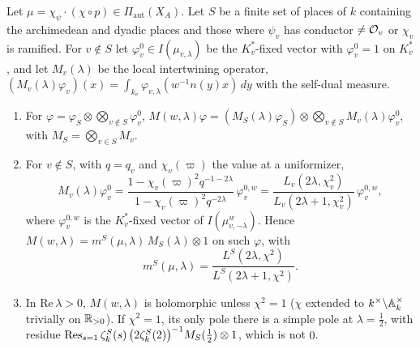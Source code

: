 \begin{lemma}\label{lem:intertwining}
Let $\mu=\chi_\psi\cdot(\chi\circ p)\in\Pi_{\mathrm{aut}}(X_A)$. Let $S$
be a finite set of places of $k$ containing the archimedean and dyadic
places and those where $\psi_v$ has conductor $\ne\mathcal{O}_v$ or $\chi_v$ is
ramified. For $v\notin S$ let $\varphi_v^0\in I(\mu_{v,\lambda})$ be the
$K_v^*$-fixed vector with $\varphi_v^0=1$ on $K_v^*$, and let $M_v(\lambda)$
be the local intertwining operator, $(M_v(\lambda)\varphi_v)(x)=
\int_{k_v}\varphi_{v,\lambda}(w^{-1}n(y)x)\,dy$ with the self-dual
measure.
\begin{enumerate}[label=(\alph*)]
\item For $\varphi=\varphi_S\otimes\bigotimes_{v\notin S}\varphi_v^0$,
  $M(w,\lambda)\varphi=(M_S(\lambda)\varphi_S)\otimes\bigotimes_{v\notin S}
  M_v(\lambda)\varphi_v^0$, with $M_S=\bigotimes_{v\in S}M_v$.
\item For $v\notin S$, with $q=q_v$ and $\chi_v(\varpi)$ the value at a
  uniformizer,
  \[
  M_v(\lambda)\varphi_v^0=\frac{1-\chi_v(\varpi)^2q^{-1-2\lambda}}
  {1-\chi_v(\varpi)^2q^{-2\lambda}}\,\varphi_v^{0,w}
  =\frac{L_v(2\lambda,\chi_v^2)}{L_v(2\lambda+1,\chi_v^2)}\,
  \varphi_v^{0,w},
  \]
  where $\varphi_v^{0,w}$ is the $K_v^*$-fixed vector of
  $I(\mu^w_{v,-\lambda})$. Hence $M(w,\lambda)=m^S(\mu,\lambda)\,M_S(\lambda)
  \otimes1$ on such $\varphi$, with
  \begin{equation}\label{eq:mS}
  m^S(\mu,\lambda)=\frac{L^S(2\lambda,\chi^2)}{L^S(2\lambda+1,\chi^2)} .
  \end{equation}
\item In $\mathrm{Re}\,\lambda>0$, $M(w,\lambda)$ is holomorphic unless
  $\chi^2=1$ ($\chi$ extended to $k^\times\backslash\mathbb{A}_k^\times$ trivially
  on $\mathbb{R}_{>0}$). If $\chi^2=1$, its only pole there is a simple pole at
  $\lambda=\frac12$, with residue $\operatorname{Res}_{s=1}\zeta_k^S(s)\,
  \bigl(2\zeta_k^S(2)\bigr)^{-1}M_S(\tfrac12)\otimes1$, which is not $0$.
\end{enumerate}
\end{lemma}

